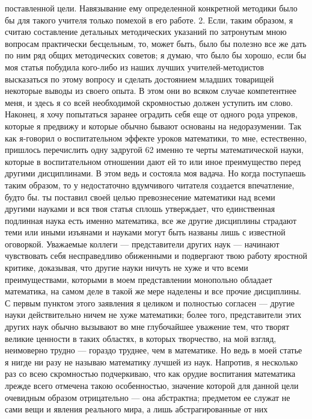 \documentclass[12pt, a4paper, openany]{book}
\begin{document}
поставленной цели. Навязывание ему определенной конкретной 
методики было бы для такого учителя только помехой 
в его работе. 
2. Если, таким образом, я считаю составление  
детальных методических указаний по затронутым мною вопросам 
практически бесцельным, то, может быть, было бы полезно 
все же дать по ним ряд общих методических советов; я  
думаю, что было бы хорошо, если бы моя статья побудила 
кого-либо из наших лучших учителей-методистов  
высказаться по этому вопросу и сделать достоянием младших 
товарищей некоторые выводы из своего опыта. В этом они 
во всяком случае компетентнее меня, и здесь я со всей  
необходимой скромностью должен уступить им слово. 
Наконец, я хочу попытаться заранее оградить себя еще 
от одного рода упреков, которые я предвижу и которые 
обычно бывают основаны на недоразумении. Так как 
я-говорил о воспитательном эффекте уроков математики, 
то мне, естественно, пришлось перечислить одну задругой 
62 
именно те черты математической науки, которые в  
воспитательном отношении дают ей то или иное преимущество 
перед другими дисциплинами. В этом ведь и состояла моя 
вадача. Но когда поступаешь таким образом, то у  
недостаточно вдумчивого читателя создается впечатление,  
будто бы. ты поставил своей целью превознесение математики 
над всеми другими науками и вся твоя статья сплошь 
утверждает, что единственная подлинная наука есть именно 
математика, все же другие дисциплины страдают теми 
или иными изъянами и науками могут быть названы 
лишь с известной оговоркой. Уважаемые коллеги —  
представители других наук — начинают чувствовать себя 
несправедливо обиженными и подвергают твою работу 
яростной критике, доказывая, что другие науки ничуть 
не хуже и что всеми преимуществами, которыми в моем 
представлении монопольно обладает математика, на самом 
деле в такой же мере наделены и все прочие дисциплины. 
С первым пунктом этого заявления я целиком и  
полностью согласен — другие науки действительно ничем 
не хуже математики; более того, представители этих  
других наук обычно вызывают во мне глубочайшее уважение 
тем, что творят великие ценности в таких областях, в  
которых творчество, на мой взгляд, неимоверно трудно — 
гораздо труднее, чем в математике. Но ведь в моей статье 
я нигде ни разу не называю математику лучшей из наук. 
Напротив, я несколько раз со всею скромностью  
подчеркиваю, что как орудие воспитания математика лрежде всего 
отмечена такою особенностью, значение которой для  
данной цели очевидным образом отрицательно — она  
абстрактна; предметом ее служат не сами вещи и явления 
реального мира, а лишь абстрагированные от них  
\end{document}
